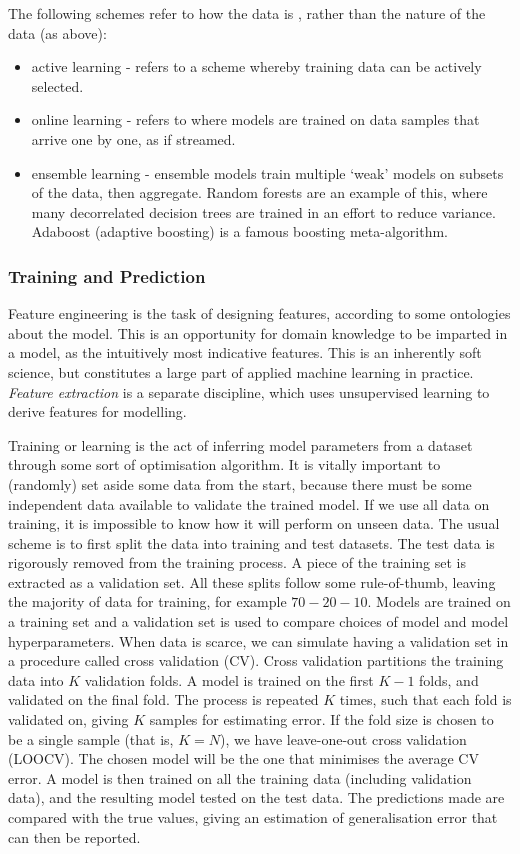 \documentclass[11pt]{amsart}
\begin{document}
The following schemes refer to how the data is , rather than the nature of the data (as above):

\begin{itemize}
\item active learning - refers to a scheme whereby training data can be actively selected.
\item online learning - refers to where models are trained on data samples that arrive one by one, as if streamed.
\item ensemble learning - ensemble models train multiple `weak' models on subsets of the data, then aggregate. Random forests are an example of this, where many decorrelated decision trees are trained in an effort to reduce variance. Adaboost (adaptive boosting) is a famous boosting  meta-algorithm.
\end{itemize}

\subsubsection{Training and Prediction}

Feature engineering is the task of designing features, according to some ontologies about the model. This is an opportunity for domain knowledge to be imparted in a model, as the intuitively most indicative features. This is an inherently soft science, but constitutes a large part of applied machine learning in practice. \emph{Feature extraction} is a separate discipline, which uses unsupervised learning to derive features for modelling.

Training or learning is the act of inferring model parameters from a dataset through some sort of optimisation algorithm. It is vitally important to (randomly) set aside some data from the start, because there must be some independent data available to validate the trained model. If we use all data on training, it is impossible to know how it will perform on unseen data. The usual scheme is to first split the data into training and test datasets. The test data is rigorously removed from the training process. A piece of the training set is extracted as a validation set. All these splits follow some rule-of-thumb, leaving the majority of data for training, for example $70-20-10$. Models are trained on a training set and a validation set is used to compare choices of model and model hyperparameters. When data is scarce, we can simulate having a validation set in a procedure called cross validation (CV). Cross validation partitions the training data into $K$ validation folds. A model is trained on the first $K - 1$ folds, and validated on the final fold. The process is repeated $K$ times, such that each fold is validated on, giving $K$ samples for estimating error. If the fold size is chosen to be a single sample (that is, $K = N$), we have leave-one-out cross validation (LOOCV). The chosen model will be the one that minimises the average CV error. A model is then trained on all the training data (including validation data), and the resulting model tested on the test data. The predictions made are compared with the true values, giving an estimation of generalisation error that can then be reported.
\end{document}
